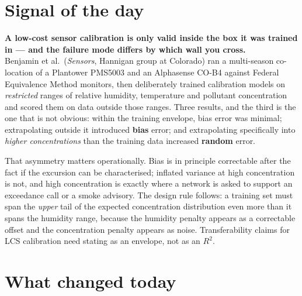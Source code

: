\documentclass[10pt]{article}
\begin{document}
\vspace{6mm}

\section*{\sffamily\bfseries\color{Deep}Signal of the day}
\vspace{-1.5mm}{\color{Amber}\rule{\linewidth}{1.1pt}}\vspace{2.5mm}

\begin{keybox}
{\sffamily\bfseries\small\color{Deep}A low-cost sensor calibration is only valid inside the
box it was trained in --- and the failure mode differs by which wall you cross.}\\[1.4mm]
\footnotesize
Benjamin et al.\ (\textit{Sensors}, Hannigan group at Colorado) ran a multi-season
co-location of a Plantower PMS5003 and an Alphasense CO-B4 against Federal Equivalence
Method monitors, then deliberately trained calibration models on \emph{restricted} ranges
of relative humidity, temperature and pollutant concentration and scored them on data
outside those ranges. Three results, and the third is the one that is not obvious:
within the training envelope, bias error was minimal; extrapolating outside it
introduced \textbf{bias} error; and extrapolating specifically into \emph{higher
concentrations} than the training data increased \textbf{random} error.

That asymmetry matters operationally. Bias is in principle correctable after the fact if
the excursion can be characterised; inflated variance at high concentration is not, and
high concentration is exactly where a network is asked to support an exceedance call or a
smoke advisory. The design rule follows: a training set must span the \emph{upper} tail of
the expected concentration distribution even more than it spans the humidity range,
because the humidity penalty appears as a correctable offset and the concentration penalty
appears as noise. Transferability claims for LCS calibration need stating as an envelope,
not as an $R^2$.
\end{keybox}

\vspace{3mm}

\section*{\sffamily\bfseries\color{Deep}What changed today}
\vspace{-1.5mm}{\color{Amber}\rule{\linewidth}{1.1pt}}\vspace{2.5mm}
\end{document}

